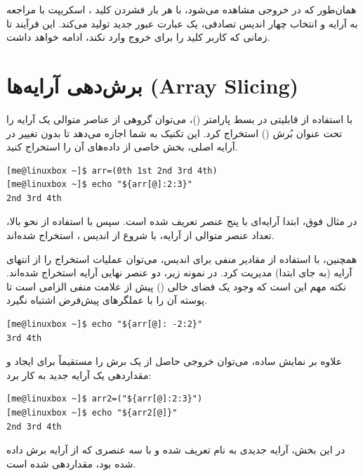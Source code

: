همان‌طور که در خروجی مشاهده می‌شود، با هر بار فشردن کلید ، اسکریپت با مراجعه به آرایه و انتخاب چهار اندیس تصادفی، یک عبارت عبور جدید تولید می‌کند. این فرآیند تا زمانی که کاربر کلید  را برای خروج وارد نکند، ادامه خواهد داشت.

\section{برش‌دهی آرایه‌ها (Array Slicing)}

با استفاده از قابلیتی در بسط پارامتر ()، می‌توان گروهی از عناصر متوالی یک آرایه را تحت عنوان بُرش () استخراج کرد. این تکنیک به شما اجازه می‌دهد تا بدون تغییر در آرایه اصلی، بخش خاصی از داده‌های آن را استخراج کنید.

\begin{latin}
\begin{lstlisting}
[me@linuxbox ~]$ arr=(0th 1st 2nd 3rd 4th)
[me@linuxbox ~]$ echo "${arr[@]:2:3}"
2nd 3rd 4th
\end{lstlisting}
\end{latin}

در مثال فوق، ابتدا آرایه‌ای با پنج عنصر تعریف شده است. سپس با استفاده از نحو بالا، تعداد  عنصر متوالی از آرایه، با شروع از اندیس ، استخراج شده‌اند.

همچنین، با استفاده از مقادیر منفی برای اندیس، می‌توان عملیات استخراج را از انتهای آرایه (به جای ابتدا) مدیریت کرد. در نمونه زیر، دو عنصر نهایی آرایه استخراج شده‌اند. نکته مهم این است که وجود یک فضای خالی () پیش از علامت منفی الزامی است تا پوسته آن را با عملگرهای پیش‌فرض اشتباه نگیرد.

\begin{latin}
\begin{lstlisting}
[me@linuxbox ~]$ echo "${arr[@]: -2:2}"
3rd 4th
\end{lstlisting}
\end{latin}

علاوه بر نمایش ساده، می‌توان خروجی حاصل از یک برش را مستقیماً برای ایجاد و مقداردهی یک آرایه جدید به کار برد:

\begin{latin}
\begin{lstlisting}
[me@linuxbox ~]$ arr2=("${arr[@]:2:3}")
[me@linuxbox ~]$ echo "${arr2[@]}"
2nd 3rd 4th
\end{lstlisting}
\end{latin}

در این بخش، آرایه جدیدی به نام  تعریف شده و با سه عنصری که از آرایه  برش داده شده بود، مقداردهی شده است.

